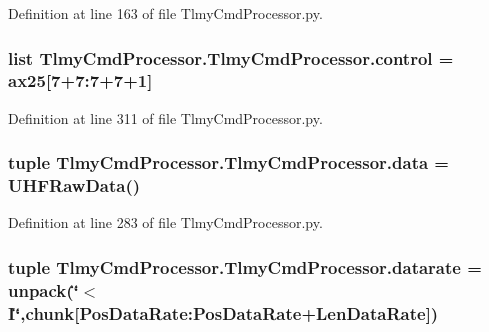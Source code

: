 Definition at line 163 of file Tlmy\+Cmd\+Processor.\+py.

\hypertarget{namespace_tlmy_cmd_processor_1_1_tlmy_cmd_processor_a716864d98c3b40bcc1b52b6f3c0f67ef}{}
\subsubsection[{control}]{\setlength{\rightskip}{0pt plus 5cm}list Tlmy\+Cmd\+Processor.\+Tlmy\+Cmd\+Processor.\+control = {\bf ax25}\mbox{[}7+7\+:7+7+1\mbox{]}}\label{namespace_tlmy_cmd_processor_1_1_tlmy_cmd_processor_a716864d98c3b40bcc1b52b6f3c0f67ef}


Definition at line 311 of file Tlmy\+Cmd\+Processor.\+py.

\hypertarget{namespace_tlmy_cmd_processor_1_1_tlmy_cmd_processor_aa2dfd09891072d77d04b841a8bed1462}{}
\subsubsection[{data}]{\setlength{\rightskip}{0pt plus 5cm}tuple Tlmy\+Cmd\+Processor.\+Tlmy\+Cmd\+Processor.\+data = {\bf U\+H\+F\+Raw\+Data}()}\label{namespace_tlmy_cmd_processor_1_1_tlmy_cmd_processor_aa2dfd09891072d77d04b841a8bed1462}


Definition at line 283 of file Tlmy\+Cmd\+Processor.\+py.

\hypertarget{namespace_tlmy_cmd_processor_1_1_tlmy_cmd_processor_a617a858e77fc14ff5243134c29be790b}{}
\subsubsection[{datarate}]{\setlength{\rightskip}{0pt plus 5cm}tuple Tlmy\+Cmd\+Processor.\+Tlmy\+Cmd\+Processor.\+datarate = unpack(\char`\"{}$<$I\char`\"{},chunk\mbox{[}Pos\+Data\+Rate\+:\+Pos\+Data\+Rate+{\bf Len\+Data\+Rate}\mbox{]})}\label{namespace_tlmy_cmd_processor_1_1_tlmy_cmd_processor_a617a858e77fc14ff5243134c29be790b}


